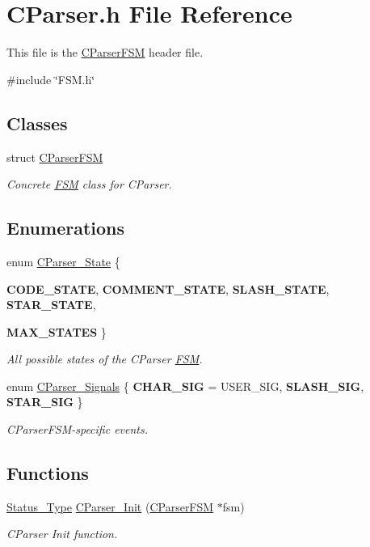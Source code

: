 \section{CParser.h File Reference}
\label{_c_parser_8h}


This file is the \hyperlink{struct_c_parser_f_s_m}{CParserFSM} header file.  


{\ttfamily \#include \char`\"{}FSM.h\char`\"{}}\par
\subsection*{Classes}
\begin{DoxyCompactItemize}
\item 
struct \hyperlink{struct_c_parser_f_s_m}{CParserFSM}
\begin{DoxyCompactList}\small\item\em Concrete \hyperlink{struct_f_s_m}{FSM} class for CParser. \end{DoxyCompactList}\end{DoxyCompactItemize}
\subsection*{Enumerations}
\begin{DoxyCompactItemize}
\item 
enum \hyperlink{group___c_parser_ga5ccffdf5b5411f5458cc65c8acce9cfa}{CParser\_\-State} \{ \par
{\bfseries CODE\_\-STATE}, 
{\bfseries COMMENT\_\-STATE}, 
{\bfseries SLASH\_\-STATE}, 
{\bfseries STAR\_\-STATE}, 
\par
{\bfseries MAX\_\-STATES}
 \}
\begin{DoxyCompactList}\small\item\em All possible states of the CParser \hyperlink{struct_f_s_m}{FSM}. \end{DoxyCompactList}\item 
enum \hyperlink{group___c_parser_ga635baa20a1a5f858397663df82358849}{CParser\_\-Signals} \{ {\bfseries CHAR\_\-SIG} =  USER\_\-SIG, 
{\bfseries SLASH\_\-SIG}, 
{\bfseries STAR\_\-SIG}
 \}
\begin{DoxyCompactList}\small\item\em CParserFSM-\/specific events. \end{DoxyCompactList}\end{DoxyCompactItemize}
\subsection*{Functions}
\begin{DoxyCompactItemize}
\item 
\hyperlink{group___f_s_m_ga3ef97600b5131dbf1b9a798e760e9268}{Status\_\-Type} \hyperlink{group___c_parser_gadc7edd159a43c4d49eac247a456763be}{CParser\_\-Init} (\hyperlink{struct_c_parser_f_s_m}{CParserFSM} $\ast$fsm)
\begin{DoxyCompactList}\small\item\em CParser Init function. \end{DoxyCompactList}\end{DoxyCompactItemize}


